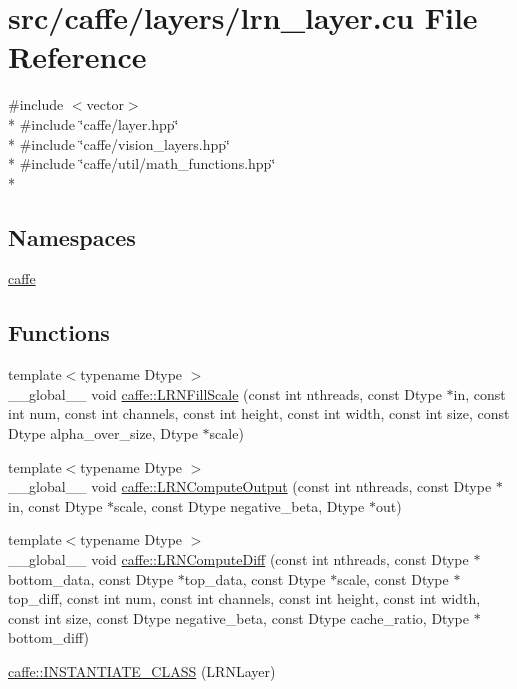 \hypertarget{lrn__layer_8cu}{\section{src/caffe/layers/lrn\+\_\+layer.cu File Reference}
\label{lrn__layer_8cu}
}
{\ttfamily \#include $<$vector$>$}\\*
{\ttfamily \#include \char`\"{}caffe/layer.\+hpp\char`\"{}}\\*
{\ttfamily \#include \char`\"{}caffe/vision\+\_\+layers.\+hpp\char`\"{}}\\*
{\ttfamily \#include \char`\"{}caffe/util/math\+\_\+functions.\+hpp\char`\"{}}\\*
\subsection*{Namespaces}
\begin{DoxyCompactItemize}
\item 
 \hyperlink{namespacecaffe}{caffe}
\end{DoxyCompactItemize}
\subsection*{Functions}
\begin{DoxyCompactItemize}
\item 
{\footnotesize template$<$typename Dtype $>$ }\\\+\_\+\+\_\+global\+\_\+\+\_\+ void \hyperlink{namespacecaffe_a641351385260c312bede8b3fad607507}{caffe\+::\+L\+R\+N\+Fill\+Scale} (const int nthreads, const Dtype $\ast$in, const int num, const int channels, const int height, const int width, const int size, const Dtype alpha\+\_\+over\+\_\+size, Dtype $\ast$scale)
\item 
{\footnotesize template$<$typename Dtype $>$ }\\\+\_\+\+\_\+global\+\_\+\+\_\+ void \hyperlink{namespacecaffe_a3e2b25f3998a5c8761212e69b9388960}{caffe\+::\+L\+R\+N\+Compute\+Output} (const int nthreads, const Dtype $\ast$in, const Dtype $\ast$scale, const Dtype negative\+\_\+beta, Dtype $\ast$out)
\item 
{\footnotesize template$<$typename Dtype $>$ }\\\+\_\+\+\_\+global\+\_\+\+\_\+ void \hyperlink{namespacecaffe_af1adaf470bdf0ce07ee640f5b7ada3aa}{caffe\+::\+L\+R\+N\+Compute\+Diff} (const int nthreads, const Dtype $\ast$bottom\+\_\+data, const Dtype $\ast$top\+\_\+data, const Dtype $\ast$scale, const Dtype $\ast$top\+\_\+diff, const int num, const int channels, const int height, const int width, const int size, const Dtype negative\+\_\+beta, const Dtype cache\+\_\+ratio, Dtype $\ast$bottom\+\_\+diff)
\item 
\hyperlink{namespacecaffe_a818b23abbae9ca690cd0a4bd07a8870e}{caffe\+::\+I\+N\+S\+T\+A\+N\+T\+I\+A\+T\+E\+\_\+\+C\+L\+A\+S\+S} (L\+R\+N\+Layer)
\end{DoxyCompactItemize}
